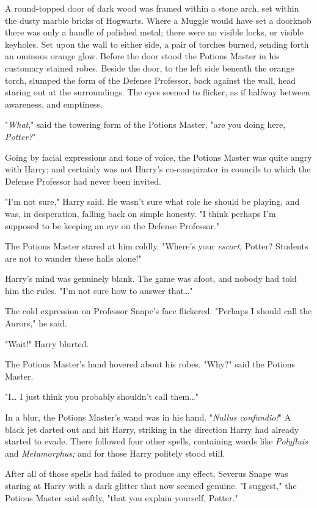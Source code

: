 A round-topped door of dark wood was framed within a stone arch, set within the 
dusty marble bricks of Hogwarts. Where a Muggle would have set a doorknob there 
was only a handle of polished metal; there were no visible locks, or visible 
keyholes. Set upon the wall to either side, a pair of torches burned, sending 
forth an ominous orange glow. Before the door stood the Potions Master in his 
customary stained robes. Beside the door, to the left side beneath the orange 
torch, slumped the form of the Defense Professor, back against the wall, head 
staring out at the surroundings. The eyes seemed to flicker, as if halfway 
between awareness, and emptiness.

"\emph{What}," said the towering form of the Potions Master, "are you doing 
here, \emph{Potter?}"

Going by facial expressions and tone of voice, the Potions Master was quite 
angry with Harry; and certainly was not Harry's co-conspirator in councils to 
which the Defense Professor had never been invited.

"I'm not sure," Harry said. He wasn't sure what role he should be playing, and 
was, in desperation, falling back on simple honesty. "I think perhaps I'm 
supposed to be keeping an eye on the Defense Professor."

The Potions Master stared at him coldly. "Where's your \emph{escort,} Potter? 
Students are not to wander these halls alone!"

Harry's mind was genuinely blank. The game was afoot, and nobody had told him 
the rules. "I'm not sure how to answer that{\ldots}"

The cold expression on Professor Snape's face flickered. "Perhaps I should call 
the Aurors," he said.

"Wait!" Harry blurted.

The Potions Master's hand hovered about his robes. "Why?" said the Potions 
Master.

"I{\ldots} I just think you probably shouldn't call them{\ldots}"

In a blur, the Potions Master's wand was in his hand. "\emph{Nullus 
confundio!}" A black jet darted out and hit Harry, striking in the direction 
Harry had already started to evade. There followed four other spells, 
containing words like \emph{Polyfluis} and \emph{Metamorphus;} and for those 
Harry politely stood still.

After all of those spells had failed to produce any effect, Severus Snape was 
staring at Harry with a dark glitter that now seemed genuine. "I suggest," the 
Potions Master said softly, "that you explain yourself, Potter."

